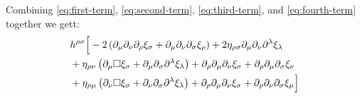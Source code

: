 \documentclass[aps,prd,preprint]{revtex4-1}
\begin{document}
Combining \eqref{eq:first-term}, \eqref{eq:second-term}, \eqref{eq:third-term}, and \eqref{eq:fourth-term} together
we gett:
\begin{align}
& h^{\rho\sigma} \Big[
  - 2 \left( \partial_\mu \partial_\nu \partial_\rho \xi_\sigma + \partial_\mu \partial_\nu \partial_\sigma \xi_\rho \right)
  + 2 \eta_{\rho\sigma} \partial_\mu \partial_\nu \partial^\lambda \xi_\lambda \notag \\
  & + \eta_{\rho \nu} \left( \partial_\mu \square \xi_\sigma +
    \partial_\mu \partial_\sigma \partial^\lambda \xi_\lambda \right) +
    \partial_\rho \partial_\mu \partial_\nu \xi_\sigma +
    \partial_\rho \partial_\mu \partial_\sigma \xi_\nu \notag \\
  & + \eta_{\rho \mu} \left( \partial_\nu \square \xi_\sigma +
    \partial_\nu \partial_\sigma \partial^\lambda \xi_\lambda \right) +
    \partial_\rho \partial_\mu \partial_\nu \xi_\sigma +
    \partial_\rho \partial_\nu \partial_\sigma \xi_\mu
\Big]
\end{align}
\end{document}
